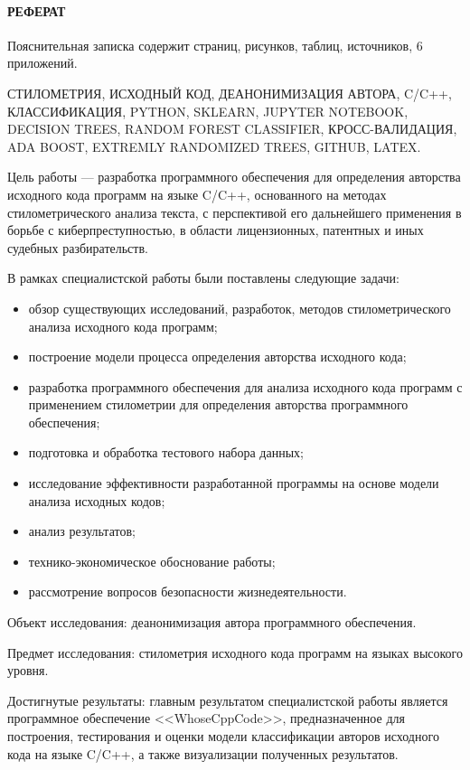 
\newpage
{}
\paragraph{\hfill РЕФЕРАТ \hfill}
Пояснительная записка содержит  страниц,  рисунков,  таблиц,  источников,
6 приложений.


СТИЛОМЕТРИЯ, ИСХОДНЫЙ КОД, ДЕАНОНИМИЗАЦИЯ АВТОРА, C/C++, КЛАССИФИКАЦИЯ, PYTHON, SKLEARN, JUPYTER NOTEBOOK, DECISION
TREES, RANDOM FOREST CLASSIFIER, КРОСС-ВАЛИДАЦИЯ, ADA BOOST, EXTREMLY RANDOMIZED TREES, GITHUB, LATEX.

Цель работы --- разработка программного обеспечения для определения авторства исходного кода программ
на языке C/C++, основанного на методах стилометрического анализа текста, с перспективой его
дальнейшего применения в борьбе с киберпреступностью, в области лицензионных, патентных и иных судебных разбирательств.

В рамках специалистской работы были поставлены следующие задачи: 
\begin{itemize}
  \item обзор существующих исследований, разработок, методов стилометрического анализа исходного кода программ;
\item построение модели процесса определения авторства исходного кода;
  \item разработка программного обеспечения для анализа исходного кода программ с применением стилометрии для
определения авторства программного обеспечения;
  \item подготовка и обработка тестового набора данных;
  \item исследование эффективности разработанной программы на основе модели анализа исходных кодов;
  \item анализ результатов;
  \item технико-экономическое обоснование работы;
  \item рассмотрение вопросов безопасности жизнедеятельности.
\end{itemize}

Объект исследования: деанонимизация автора программного обеспечения. 

Предмет исследования: стилометрия исходного кода программ на языках высокого уровня.

Достигнутые результаты: главным результатом специалистской работы является 
программное обеспечение <<WhoseCppCode>>, предназначенное для построения,
тестирования и оценки модели классификации авторов исходного кода на языке C/C++,
а также визуализации полученных результатов.

